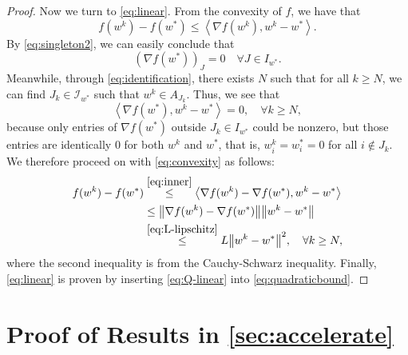 \documentclass{article}
\theoremstyle{plain}
\theoremstyle{definition}
\theoremstyle{remark}
\newcommand{\I}{\mathcal{I}}
\newcommand\inner[2]{\left\langle #1, #2 \right\rangle}
\newcommand{\norm}[1]{{\left\|{#1}\right\|}}
\begin{document}
\begin{proof}
Now we turn to \cref{eq:linear}.
From the convexity of $f$, we have that
\begin{equation}
	f(w^k) - f(w^*) \leq \inner{\nabla f(w^k)}{w^k - w^*}.
	\label{eq:convexity}
\end{equation}
By \cref{eq:singleton2}, we can
easily conclude that 
\begin{equation}
\label{eq:nabla_on_J=0}
(\nabla f(w^*))_J = 0 \quad \forall J\in I_{w^*}.
\end{equation}
Meanwhile, through \cref{eq:identification}, there exists $N$ such that for all 
$k
\geq N$, we can find $J_k \in \I_{w^*}$ such that
$w^k \in A_{J_k}$. Thus, we see that
	\begin{equation}
	\label{eq:inner}
	\inner{\nabla f(w^*)}{w^k - w^*} = 0, \quad \forall k \geq N,
	\end{equation}
because only entries of $\nabla f(w^*)$ outside $J_k\in I_{w^*}$ could be 
nonzero,
but those entries are identically $0$ for both $w^k$ and $w^*$, that is, 
$w^k_i 
= w_i^* = 0$ for all $i\notin J_k$.
We therefore proceed on with \cref{eq:convexity} as follows:
\begin{align}
	\nonumber
f(w^k) - f(w^*) &\overset{\cref{eq:inner}}{\leq} \inner{\nabla f(w^k) - \nabla 
f(w^*)}{w^k -
w^*}\\
	\nonumber
&\leq \norm{\nabla f(w^k) - \nabla f(w^*)}\norm{w^k - w^*}\\
&\overset{\cref{eq:L-lipschitz}}{\leq}  L \norm{w^k-w^*}^2, \quad \forall k 
\geq N,
\label{eq:quadraticbound}
\end{align}
where the second inequality is from the Cauchy-Schwarz inequality.
Finally, \cref{eq:linear} is proven by inserting \cref{eq:Q-linear}
into \cref{eq:quadraticbound}.
\end{proof}

\section{Proof of Results in \cref{sec:accelerate}}
\end{document}
